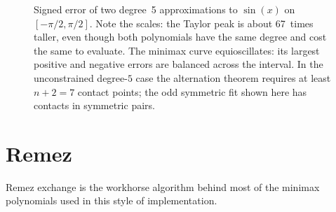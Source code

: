 \documentclass[manuscript, nonacm]{acmart}
\newcommand{\approxdata}[1]{docs/approximating_functions/data/#1}
\begin{document}
    \begin{figure}[tbp]
        \centering
        \hfill
        \caption{Signed error of two degree~5 approximations to $\sin(x)$ on
            $[-\pi/2,\pi/2]$. Note the scales: the Taylor peak is about 67~times
            taller, even though both polynomials have the same degree and cost the
            same to evaluate. The minimax curve equioscillates: its largest
            positive and negative errors are balanced across the interval. In the
            unconstrained degree-$5$ case the alternation theorem requires at least
            $n + 2 = 7$ contact points; the odd symmetric fit shown here has contacts
            in symmetric pairs.}
        \label{fig:minimaxcompare}
    \end{figure}



    \section{Remez}

    Remez exchange is the workhorse algorithm behind most of the minimax
    polynomials used in this style of implementation.
\end{document}
